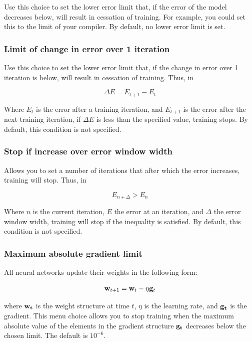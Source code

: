 Use this choice to set the lower error limit that, if the error of the
model decreases below, will result in cessation of training.  For
example, you could set this to the limit of your compiler.  By
default, no lower error limit is set.

\subsubsection{Limit of change in error over 1 iteration}

Use this choice to set the lower error limit that, if the change in
error over 1 iteration is below, will result in cessation of training.
Thus, in

\begin{equation}
\Delta E = E_{t+1} - E_t
\end{equation}

Where $E_t$ is the error after a training iteration, and $E_{t+1}$ is
the error after the next training iteration, if $\Delta E$ is less
than the specified value, training stops.  By default, this condition
is not specified.

\subsubsection{Stop if increase over error window width}

Allows you to set a number of iterations that after which the error
increases, training will stop.  Thus, in

\begin{equation}
E_{n+\Delta} > E_{n}
\end{equation}

Where $n$ is the current iteration, $E$ the error at an iteration, and
$\Delta$ the error window width, training will stop if the inequality
is satisfied.  By default, this condition is not specified.

\subsubsection{Maximum absolute gradient limit}

All neural networks update their weights in the following form:

\begin{equation}
{\bf w}_{t+1} = {\bf w}_t - \eta {\bf g}_t
\end{equation}

where $\bf{w}_t$ is the weight structure at time $t$, $\eta$ is the
learning rate, and $\bf{g}_t$ is the gradient.  This menu choice
allows you to stop training when the maximum absolute value of the
elements in the gradient structure $\bf{g}_t$ decreases below the
chosen limit.  The default is $10^{-6}$.


